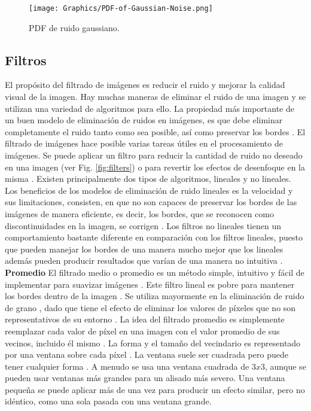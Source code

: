 \begin{figure}[h!]
    \centering
    \texttt{[image: Graphics/PDF-of-Gaussian-Noise.png]}
    \caption{PDF de ruido gaussiano.}
    \label{fig:PDFGaussianNoise}
\end{figure}

\subsection{Filtros} \label{sec:NoiseFilters}

El propósito del filtrado de imágenes es reducir el ruido y mejorar la calidad visual de la imagen. Hay muchas maneras de eliminar el ruido de una imagen y se utilizan una variedad de algoritmos \cite{MandarMeghana, PawanManojSumitAshok} para ello. La propiedad más importante de un buen modelo de eliminación de ruidos en imágenes, es que debe eliminar completamente el ruido tanto como sea posible, así como preservar los bordes \cite{PawanManojSumitAshok}. El filtrado de imágenes hace posible varias tareas útiles en el procesamiento de imágenes. Se puede aplicar un filtro para reducir la cantidad de ruido no deseado en una imagen (ver Fig. \ref{fig:filters}) o para revertir los efectos de desenfoque en la misma \cite{RuchikaGaurav}. Existen principalmente dos tipos de algoritmos, lineales y no lineales. Los beneficios de los modelos de eliminación de ruido lineales es la velocidad y sus limitaciones, consisten, en que no son capaces de preservar los bordes de las imágenes de manera eficiente, es decir, los bordes, que se reconocen como discontinuidades en la imagen, se corrigen \cite{PawanManojSumitAshok}. Los filtros no lineales tienen un comportamiento bastante diferente en comparación con los filtros lineales, puesto que pueden manejar los bordes de una manera mucho mejor que los lineales además pueden producir resultados que varían de una manera no intuitiva \cite{RuchikaGaurav}.\\

\textbf{Promedio}
El filtrado medio o promedio es un método simple, intuitivo y fácil de implementar para suavizar imágenes \cite{RajeshUday}. Este filtro lineal es pobre para mantener los bordes dentro de la imagen \cite{JamesYixinStephen}. Se utiliza mayormente en la eliminación de ruido de grano \cite{PawanManojSumitAshok}, dado que tiene el efecto de eliminar los valores de píxeles que no son representativos de su entorno \cite{RajeshUday}. La idea del filtrado promedio es simplemente reemplazar cada valor de píxel en una imagen con el valor promedio de sus vecinos, incluido él mismo \cite{RajeshUday}. La forma y el tamaño del vecindario es representado por una ventana sobre cada píxel \cite{PawanManojSumitAshok}. La ventana suele ser cuadrada pero puede tener cualquier forma \cite{MandarMeghana}. A menudo se usa una ventana cuadrada de $3 x 3$, aunque se pueden usar ventanas más grandes para un alisado más severo. Una ventana pequeña se puede aplicar más de una vez para producir un efecto similar, pero no idéntico, como una sola pasada con una ventana grande\cite{RajeshUday}.\\


